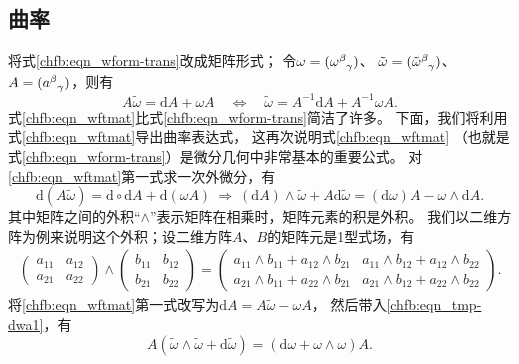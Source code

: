 
\subsection{曲率}\label{chfb:sec_curvature}


将式\eqref{chfb:eqn_wform-trans}改成矩阵形式；
令$\omega=(\omega_{\hphantom{\alpha}\gamma}^\beta)$、
$\tilde{\omega}=(\tilde{\omega}_{\hphantom{\alpha}\gamma}^\beta)$、
$A=(a_{\hphantom{\alpha}\gamma}^\beta)$，则有
\begin{equation}\label{chfb:eqn_wftmat}
    A \tilde{\omega}= \mathrm{d}A + \omega A
    \quad \Leftrightarrow \quad
    \tilde{\omega}= A^{-1} \mathrm{d}A + A^{-1}\omega A .
\end{equation}
式\eqref{chfb:eqn_wftmat}比式\eqref{chfb:eqn_wform-trans}简洁了许多。
下面，我们将利用式\eqref{chfb:eqn_wftmat}导出曲率表达式，
这再次说明式\eqref{chfb:eqn_wftmat}
（也就是式\eqref{chfb:eqn_wform-trans}）是微分几何中非常基本的重要公式。
对\eqref{chfb:eqn_wftmat}第一式求一次外微分，有
\begin{equation}\label{chfb:eqn_tmp-dwa1}
    \mathrm{d} (A \tilde{\omega})= \mathrm{d}\circ\mathrm{d}A + \mathrm{d}(\omega A)
    \ \Rightarrow \
    (\mathrm{d} A)\wedge \tilde{\omega}+ A \mathrm{d} \tilde{\omega} 
    =(\mathrm{d}\omega) A - \omega\wedge \mathrm{d} A .
\end{equation}
其中矩阵之间的外积“$\wedge$”表示矩阵在相乘时，矩阵元素的积是外积。
我们以二维方阵为例来说明这个外积；设二维方阵$A$、$B$的矩阵元是1型式场，有
\begin{align*}
	\begin{pmatrix}
		a_{11} & a_{12} \\ a_{21} & a_{22} 
	\end{pmatrix} \wedge
	\begin{pmatrix}
		b_{11} & b_{12} \\ b_{21} & b_{22} 
	\end{pmatrix} 
	=\begin{pmatrix}
		a_{11}\wedge b_{11} + a_{12}\wedge b_{21} & a_{11}\wedge b_{12} + a_{12}\wedge b_{22} \\ 
		a_{21}\wedge b_{11} + a_{22}\wedge b_{21} & a_{21}\wedge b_{12} + a_{22}\wedge b_{22}
	\end{pmatrix}.
\end{align*}
将\eqref{chfb:eqn_wftmat}第一式改写为$\mathrm{d} A = A \tilde{\omega}-\omega A $，
然后带入\eqref{chfb:eqn_tmp-dwa1}，有
\begin{equation}\label{chfb:eqn_ATheta}
    A (\tilde{\omega}\wedge \tilde{\omega} + \mathrm{d} \tilde{\omega} )
    =(\mathrm{d}\omega +  \omega\wedge\omega )A .
\end{equation}



